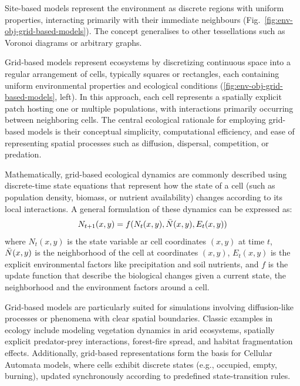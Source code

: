 Site-based models represent the environment as discrete regions with uniform properties, interacting primarily with their immediate neighbours (Fig.~\ref{fig:env-obj-grid-based-models}). The concept generalises to other tessellations such as Voronoi diagrams or arbitrary graphs.

Grid-based models represent ecosystems by discretizing continuous space into a regular arrangement of cells, typically squares or rectangles, each containing uniform environmental properties and ecological conditions (\cref{fig:env-obj-grid-based-models}, left). In this approach, each cell represents a spatially explicit patch hosting one or multiple populations, with interactions primarily occurring between neighboring cells. The central ecological rationale for employing grid-based models is their conceptual simplicity, computational efficiency, and ease of representing spatial processes such as diffusion, dispersal, competition, or predation.

Mathematically, grid-based ecological dynamics are commonly described using discrete-time state equations that represent how the state of a cell (such as population density, biomass, or nutrient availability) changes according to its local interactions. A general formulation of these dynamics can be expressed as:
\begin{align}
    N_{t+1}(x,y) = f(N_t(x,y), \Bar{N}(x, y), E_t(x, y))
\end{align}
where $N_t(x, y)$ is the state variable ar cell coordinates $(x, y)$ at time $t$, $\Bar{N}(x, y)$ is the neighborhood of the cell at coordinates $(x, y)$, $E_t(x, y)$ is the explicit environmental factors like precipitation and soil nutrients, and $f$ is the update function that describe the biological changes given a current state, the neighborhood and the environment factors around a cell.

Grid-based models are particularly suited for simulations involving diffusion-like processes or phenomena with clear spatial boundaries. Classic examples in ecology include modeling vegetation dynamics in arid ecosystems, spatially explicit predator-prey interactions, forest-fire spread, and habitat fragmentation effects. Additionally, grid-based representations form the basis for Cellular Automata models, where cells exhibit discrete states (e.g., occupied, empty, burning), updated synchronously according to predefined state-transition rules.

